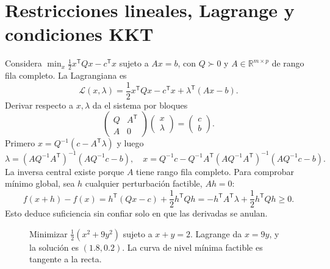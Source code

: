 \documentclass[11pt,a4paper]{article}
\newcommand{\R}{\mathbb R}
\newcommand{\T}{^{\mathsf T}}
\theoremstyle{definition}
\begin{document}
\section{Restricciones lineales, Lagrange y condiciones KKT}
Considera $\min_x\tfrac12x\T Qx-c\T x$ sujeto a $A x=b$, con $Q\succ0$ y $A\in\R^{m\times p}$ de rango fila completo. La Lagrangiana es
\[
\mathcal L(x,\lambda)=\frac12x\T Qx-c\T x+\lambda\T(Ax-b).
\]
Derivar respecto a $x,\lambda$ da el sistema por bloques
\[
\begin{pmatrix}Q&A\T\\A&0\end{pmatrix}
\begin{pmatrix}x\\\lambda\end{pmatrix}
=\begin{pmatrix}c\\b\end{pmatrix}.
\]
Primero $x=Q^{-1}(c-A\T\lambda)$ y luego
\[
\lambda=(AQ^{-1}A\T)^{-1}(AQ^{-1}c-b),\quad
x=Q^{-1}c-Q^{-1}A\T(AQ^{-1}A\T)^{-1}(AQ^{-1}c-b).
\]
La inversa central existe porque $A$ tiene rango fila completo. Para comprobar mínimo global, sea $h$ cualquier perturbación factible, $Ah=0$:
\[
f(x+h)-f(x)=h\T(Qx-c)+\frac12h\T Qh
=-h\T A\T\lambda+\frac12h\T Qh\ge0.
\]
Esto deduce suficiencia sin confiar solo en que las derivadas se anulan.

\begin{figure}[H]\centering
{}
\caption{Minimizar $\tfrac12(x^2+9y^2)$ sujeto a $x+y=2$. Lagrange da $x=9y$, y la solución es $(1.8,0.2)$. La curva de nivel mínima factible es tangente a la recta.}
\end{figure}
\end{document}
